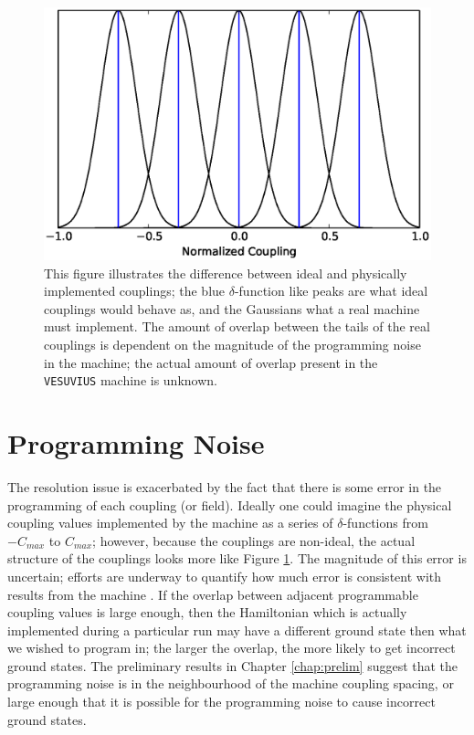 \begin{figure}
	\includegraphics{img/coupling_spread.eps}
	\caption[Ideal vs. Physical Couplings]{This figure illustrates the difference between ideal and physically implemented couplings; the blue $\delta$-function like peaks are what ideal couplings would behave as, and the Gaussians what a real machine must implement.  The amount of overlap between the tails of the real couplings is dependent on the magnitude of the programming noise in the machine; the actual amount of overlap present in the \texttt{VESUVIUS} machine is unknown.}
	\label{fig:coupling_spread}
\end{figure}

\section{Programming Noise}
\label{sec:noise}
The resolution issue is exacerbated by the fact that there is some error in the programming of each coupling (or field).  Ideally one could imagine the physical coupling values implemented by the machine as a series of $\delta$-functions from $-C_{max}$ to $C_{max}$; however, because the couplings are non-ideal, the actual structure of the couplings looks more like Figure \ref{fig:coupling_spread}.  The magnitude of this error is uncertain; efforts are underway to quantify how much error is consistent with results from the machine \cite{aaron}.  If the overlap between adjacent programmable coupling values is large enough, then the Hamiltonian which is actually implemented during a particular run may have a different ground state then what we wished to program in; the larger the overlap, the more likely to get incorrect ground states.  The preliminary results in Chapter \ref{chap:prelim} suggest that the programming noise is in the neighbourhood of the machine coupling spacing, or large enough that it is possible for the programming noise to cause incorrect ground states.

